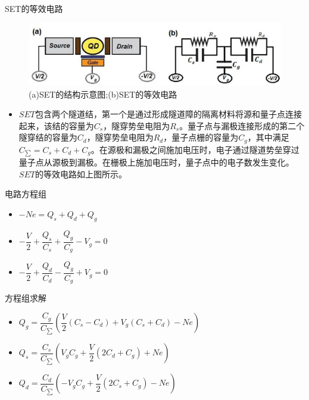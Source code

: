 \documentclass{beamer}[fontset=windows]
\begin{document}
    \begin{frame}
        \begin{block}{SET的等效电路}
            	\begin{figure}[H]
            		\centering
            		\hspace{2em}\includegraphics[width=.8\linewidth]{pic/2.jpg}
            		\caption{(a)SET的结构示意图;(b)SET的等效电路\cite{MOULHIM2020114078}
            		}
            	\end{figure}
        \begin{itemize}
        \item\small{ $SET$包含两个隧道结，第一个是通过形成隧道障的隔离材料将源和量子点连接起来，该结的容量为$C_{s}$，隧穿势垒电阻为$R_{s}$。量子点与漏极连接形成的第二个隧穿结的容量为$C_{d}$，隧穿势垒电阻为$R_{d}$，量子点栅的容量为$C_{g}$，其中满足$C_{\sum}=C_{s}+C_{d}+C_{g}$。在源极和漏极之间施加电压时，电子通过隧道势垒穿过量子点从源极到漏极。在栅极上施加电压时，量子点中的电子数发生变化。$SET$的等效电路如上图所示。}
        \end{itemize}
        \end{block}
        \end{frame}
        \begin{frame}
        \begin{block}{电路方程组}
        \begin{itemize}
        \item $-Ne=Q_{s}+Q_{d}+Q_{g}$
        \item $-\dfrac{V}{2}+\dfrac{Q_{s}}{C_{s}}+\dfrac{Q_{g}}{C_{g}}-V_{g}=0$
        \item $-\dfrac{V}{2}+\dfrac{Q_{d}}{C_{d}}-\dfrac{Q_{g}}{C_{g}}+V_{g}=0$
        \end{itemize}
        \end{block}
        \begin{block}{方程组求解}
        \begin{itemize}
        \item $Q_{g}=\dfrac{C_{g}}{C_{\sum}}(\dfrac{V}{2}(C_{s}-C_{d})+V_{g}(C_{s}+C_{d})-Ne)$
        \item $Q_{s}=\dfrac{C_{s}}{C_{\sum}}(V_{g}C_{g}+\dfrac{V}{2}(2C_{d}+C_{g})+Ne)$
        \item $Q_{d}=\dfrac{C_{d}}{C_{\sum}}(-V_{g}C_{g}+\dfrac{V}{2}(2C_{s}+C_{g})-Ne)$
        \end{itemize}
        \end{block}
        \end{frame}
\end{document}
